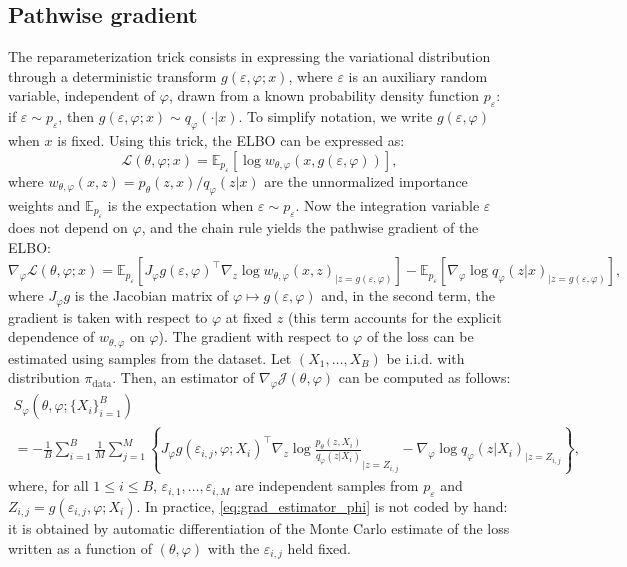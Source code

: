 \documentclass[english,graybox,envcountchap,envcountsame,sectrefs,shortlabels]{svmono}
\theoremstyle{style}
\newcommand{\eqsp}{}
\begin{document}
\subsection{Pathwise gradient}
The reparameterization trick consists in expressing the variational distribution through a deterministic transform $g(\varepsilon, \varphi;x)$, where $\varepsilon$ is an auxiliary random variable, independent of $\varphi$, drawn from a known probability density function $p_\varepsilon$: if $\varepsilon\sim p_\varepsilon$, then $g(\varepsilon,\varphi;x)\sim q_\varphi(\cdot|x)$. To simplify notation, we write $g(\varepsilon,\varphi)$ when $x$ is fixed.
Using this trick, the ELBO can be expressed as:
$$ \mathcal{L}(\theta, \varphi; x) = \mathbb{E}_{p_\varepsilon}\left[ \log w_{\theta, \varphi}(x, g(\varepsilon,\varphi)) \right]\eqsp,$$
where $w_{\theta, \varphi}(x,z) = p_{\theta}(z,x)/q_{\varphi}(z|x)$ are the unnormalized importance weights and $\mathbb{E}_{p_\varepsilon}$ is the expectation when $\varepsilon \sim p_\varepsilon$. Now the integration variable $\varepsilon$ does not depend on $\varphi$, and the chain rule yields the pathwise gradient \cite{kingma2013auto,rezende2014stochastic} of the ELBO:
\begin{equation}
\label{eq:pathwise}
\nabla^{}_{\varphi} \mathcal{L}(\theta, \varphi; x) =  \mathbb{E}_{p_\varepsilon}\left[ J_\varphi g(\varepsilon, \varphi)^\top\nabla_z \log w_{\theta, \varphi}(x,z)_{|z=g(\varepsilon,\varphi)} \right]  - \mathbb{E}_{p_\varepsilon}\left[\nabla_{\varphi} \log q_{\varphi}(z | x)_{|z=g(\varepsilon, \varphi)} \right]\eqsp,
\end{equation}
where $J_\varphi g$ is the Jacobian matrix of $\varphi\mapsto g(\varepsilon,\varphi)$ and, in the second term, the gradient is taken with respect to $\varphi$ at fixed $z$ (this term accounts for the explicit dependence of $w_{\theta,\varphi}$ on $\varphi$).
The gradient with respect to $\varphi$ of the loss can be estimated using samples from the dataset. Let $(X_1,\ldots,X_B)$ be i.i.d. with distribution $\pi_{\mathrm{data}}$. Then, an estimator of $\nabla_{\varphi} \mathcal{J}(\theta, \varphi)$ can be computed as follows:
\begin{multline} \label{eq:grad_estimator_phi}
S_{\varphi}(\theta, \varphi; \{X_i\}_{i=1}^B) \\= -\frac{1}{B} \sum_{i=1}^{B} \frac{1}{M} \sum_{j=1}^{M} \left\{J_\varphi g(\varepsilon_{i,j}, \varphi;X_i)^\top\nabla_z \log \frac{p_{\theta}(z,X_i)}{q_{\varphi}(z | X_i)}_{|z=Z_{i,j}} - \nabla_{\varphi} \log q_{\varphi}(z | X_i)_{|z=Z_{i,j}}\right\}\eqsp,
\end{multline}
where, for all $1 \leq i \leq B$, $\varepsilon_{i,1},\ldots,\varepsilon_{i,M}$ are independent samples from $p_{\varepsilon}$ and $Z_{i,j} = g(\varepsilon_{i,j}, \varphi;X_i)$. In practice, \eqref{eq:grad_estimator_phi} is not coded by hand: it is obtained by automatic differentiation of the Monte Carlo estimate of the loss written as a function of $(\theta,\varphi)$ with the $\varepsilon_{i,j}$ held fixed.
\end{document}
